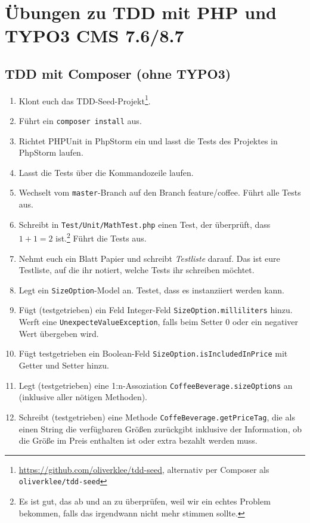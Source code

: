 \documentclass[a4paper,12pt]{scrartcl}
\begin{document}
\raggedbottom

\section{Übungen zu TDD mit PHP und TYPO3 CMS 7.6/8.7}

\subsection{TDD mit Composer (ohne TYPO3)}
\begin{enumerate}
  \item Klont euch das TDD-Seed-Projekt\footnote{\url{https://github.com/oliverklee/tdd-seed}, alternativ per Composer als \texttt{oliverklee/tdd-seed}}.
  \item Führt ein \texttt{composer install} aus.
  \item Richtet PHPUnit in PhpStorm ein und lasst die Tests des Projektes in PhpStorm laufen.
  \item Lasst die Tests über die Kommandozeile laufen.
  \item Wechselt vom \texttt{master}-Branch auf den Branch {feature/coffee}. Führt alle Tests aus.
  \item Schreibt in \texttt{Test/Unit/MathTest.php} einen Test, der überprüft, dass $1 + 1 = 2$ ist.\footnote{Es ist gut, das ab und an zu überprüfen, weil wir ein echtes Problem bekommen, falls das irgendwann nicht mehr stimmen sollte.} Führt die Tests aus.
  \item Nehmt euch ein Blatt Papier und schreibt \emph{Testliste} darauf. Das ist eure Testliste, auf die ihr notiert, welche Tests ihr schreiben möchtet.
  \item Legt ein \texttt{SizeOption}-Model an. Testet, dass es instanziiert werden kann.
  \item Fügt (testgetrieben) ein Feld Integer-Feld \texttt{SizeOption.milliliters}  hinzu. Werft eine \texttt{UnexpecteValueException}, falls beim Setter 0 oder ein negativer Wert übergeben wird.
  \item Fügt testgetrieben ein Boolean-Feld \texttt{SizeOption.isIncludedInPrice} mit Getter und Setter hinzu.
  \item Legt (testgetrieben) eine 1:n-Assoziation \texttt{CoffeeBeverage.sizeOptions} an (inklusive aller nötigen Methoden).
  \item Schreibt (testgetrieben) eine Methode \texttt{CoffeBeverage.getPriceTag}, die als einen String die verfügbaren Größen zurückgibt inklusive der Information, ob die Größe im Preis enthalten ist oder extra bezahlt werden muss.
\end{enumerate}
\pagebreak
\end{document}
